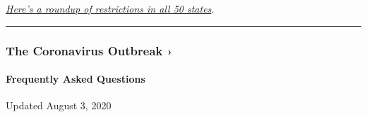 \href{https://www.nytimes3xbfgragh.onion/interactive/2020/us/states-reopen-map-coronavirus.html}{\emph{Here's
a roundup of restrictions in all 50 states}}\emph{.}

\begin{center}\rule{0.5\linewidth}{\linethickness}\end{center}

\href{https://www.nytimes3xbfgragh.onion/news-event/coronavirus?action=click\&pgtype=Article\&state=default\&region=MAIN_CONTENT_3\&context=storylines_faq}{}

\hypertarget{the-coronavirus-outbreak-}{%
\subsubsection{The Coronavirus Outbreak
›}\label{the-coronavirus-outbreak-}}

\hypertarget{frequently-asked-questions}{%
\paragraph{Frequently Asked
Questions}\label{frequently-asked-questions}}

Updated August 3, 2020

